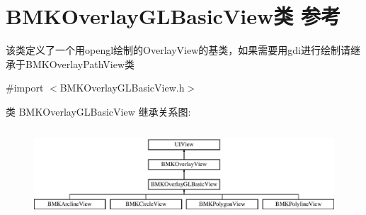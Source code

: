 \hypertarget{interface_b_m_k_overlay_g_l_basic_view}{}\section{B\+M\+K\+Overlay\+G\+L\+Basic\+View类 参考}
\label{interface_b_m_k_overlay_g_l_basic_view}


该类定义了一个用opengl绘制的\+Overlay\+View的基类，如果需要用gdi进行绘制请继承于\+B\+M\+K\+Overlay\+Path\+View类  




{\ttfamily \#import $<$B\+M\+K\+Overlay\+G\+L\+Basic\+View.\+h$>$}

类 B\+M\+K\+Overlay\+G\+L\+Basic\+View 继承关系图\+:\begin{figure}[H]
\begin{center}
\leavevmode
\includegraphics[height=3.333333cm]{interface_b_m_k_overlay_g_l_basic_view}
\end{center}
\end{figure}
